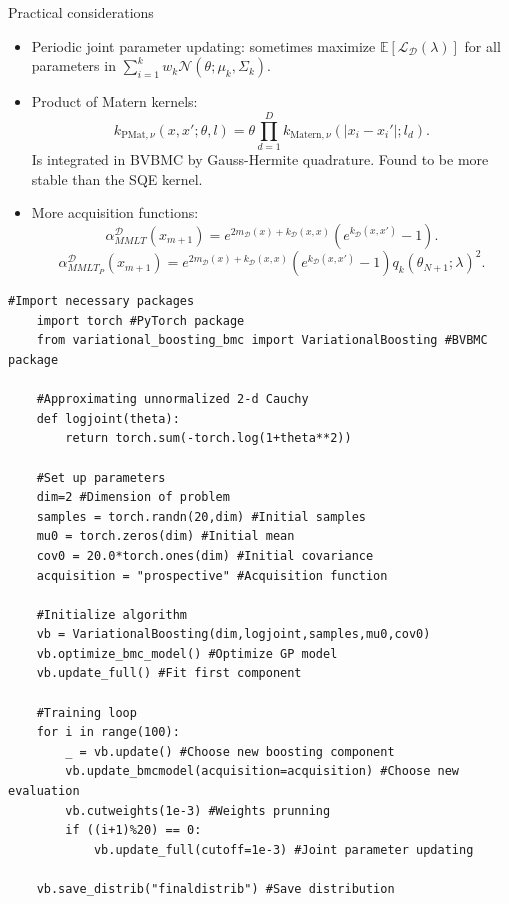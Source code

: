 \documentclass{beamer}
\def \Ev {{\mathbb E}}
\begin{document}
\begin{frame}
\begin{block}{Practical considerations}
\begin{itemize}
\item Periodic joint parameter updating: sometimes maximize $\Ev[\mathcal{L}_\mathcal{D}(\lambda)]$ for all parameters in $\sum_{i=1}^k w_k \mathcal{N}(\theta;\mu_k,\Sigma_k)$.
\item Product of Matern kernels:
\begin{equation*}
k_{\text{PMat},\nu}(x,x';\theta,l) = \theta \prod_{d=1}^D k_{\text{Matern},\nu}(|x_i-x_i'|;l_d).
\end{equation*}
Is integrated in BVBMC by Gauss-Hermite quadrature. Found to be more stable than the SQE kernel.
\item More acquisition functions:
\begin{equation*}
\alpha^\mathcal{D}_{MMLT}(x_{m+1}) = e^{2 m_\mathcal{D}(x) + k_\mathcal{D}(x,x)} \left(e^{k_\mathcal{D}(x,x')}-1\right).
\end{equation*}
\begin{equation*}
\alpha^\mathcal{D}_{MMLT_P}(x_{m+1}) = e^{2 m_\mathcal{D}(x) + k_\mathcal{D}(x,x)} \left(e^{k_\mathcal{D}(x,x')}-1\right)q_k(\theta_{N+1};\lambda)^2.
\end{equation*}
\end{itemize}
\end{block}
\end{frame}

\begin{frame}[fragile]
	\vspace{-0.25cm}
	\begin{lstlisting}[frame=single, title={Usage of BVBMC package}]
	#Import necessary packages
	import torch #PyTorch package
	from variational_boosting_bmc import VariationalBoosting #BVBMC package
	
	#Approximating unnormalized 2-d Cauchy
	def logjoint(theta):
		return torch.sum(-torch.log(1+theta**2))
	
	#Set up parameters
	dim=2 #Dimension of problem
	samples = torch.randn(20,dim) #Initial samples
	mu0 = torch.zeros(dim) #Initial mean
	cov0 = 20.0*torch.ones(dim) #Initial covariance
	acquisition = "prospective" #Acquisition function
	
	#Initialize algorithm
	vb = VariationalBoosting(dim,logjoint,samples,mu0,cov0)
	vb.optimize_bmc_model() #Optimize GP model
	vb.update_full() #Fit first component
	
	#Training loop
	for i in range(100):
		_ = vb.update() #Choose new boosting component
		vb.update_bmcmodel(acquisition=acquisition) #Choose new evaluation
		vb.cutweights(1e-3) #Weights prunning
		if ((i+1)%20) == 0:
			vb.update_full(cutoff=1e-3) #Joint parameter updating
	
	vb.save_distrib("finaldistrib") #Save distribution
	\end{lstlisting}
\end{frame}
\end{document}
